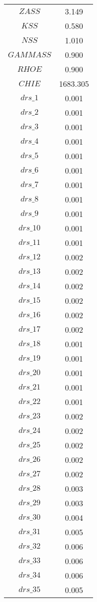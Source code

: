 \begin{center}
\begin{longtable}{cc}
$ZASS$ 	 & 	 3.149 \\
$KSS$ 	 & 	 0.580 \\
$NSS$ 	 & 	 1.010 \\
$GAMMASS$ 	 & 	 0.900 \\
$RHOE$ 	 & 	 0.900 \\
$CHIE$ 	 & 	 1683.305 \\
$drs\_1$ 	 & 	 0.001 \\
$drs\_2$ 	 & 	 0.001 \\
$drs\_3$ 	 & 	 0.001 \\
$drs\_4$ 	 & 	 0.001 \\
$drs\_5$ 	 & 	 0.001 \\
$drs\_6$ 	 & 	 0.001 \\
$drs\_7$ 	 & 	 0.001 \\
$drs\_8$ 	 & 	 0.001 \\
$drs\_9$ 	 & 	 0.001 \\
$drs\_10$ 	 & 	 0.001 \\
$drs\_11$ 	 & 	 0.001 \\
$drs\_12$ 	 & 	 0.002 \\
$drs\_13$ 	 & 	 0.002 \\
$drs\_14$ 	 & 	 0.002 \\
$drs\_15$ 	 & 	 0.002 \\
$drs\_16$ 	 & 	 0.002 \\
$drs\_17$ 	 & 	 0.002 \\
$drs\_18$ 	 & 	 0.001 \\
$drs\_19$ 	 & 	 0.001 \\
$drs\_20$ 	 & 	 0.001 \\
$drs\_21$ 	 & 	 0.001 \\
$drs\_22$ 	 & 	 0.001 \\
$drs\_23$ 	 & 	 0.002 \\
$drs\_24$ 	 & 	 0.002 \\
$drs\_25$ 	 & 	 0.002 \\
$drs\_26$ 	 & 	 0.002 \\
$drs\_27$ 	 & 	 0.002 \\
$drs\_28$ 	 & 	 0.003 \\
$drs\_29$ 	 & 	 0.003 \\
$drs\_30$ 	 & 	 0.004 \\
$drs\_31$ 	 & 	 0.005 \\
$drs\_32$ 	 & 	 0.006 \\
$drs\_33$ 	 & 	 0.006 \\
$drs\_34$ 	 & 	 0.006 \\
$drs\_35$ 	 & 	 0.005 \\

\end{longtable}
\end{center}
